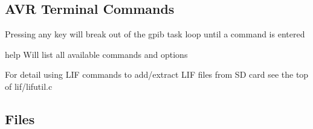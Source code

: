 \subsection*{A\+VR Terminal Commands}


\begin{DoxyItemize}
\item Pressing any key will break out of the gpib task loop until a command is entered
\begin{DoxyItemize}
\item help Will list all available commands and options
\item For detail using L\+IF commands to add/extract L\+IF files from SD card see the top of lif/lifutil.\+c 


\end{DoxyItemize}
\end{DoxyItemize}

\subsection*{Files}


